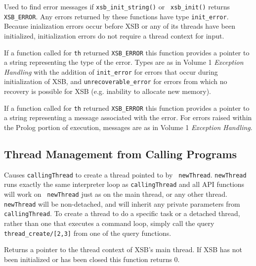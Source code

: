 \begin{description}
 
%
Used to find error messages if {\tt xsb\_init\_string()} or {\tt
  xsb\_init()} returns {\tt XSB\_ERROR}.  Any errors returned by these
functions have type {\tt init\_error}.  Because inialization errors
occur before XSB or any of its threads have been initialized,
initialization errors do not require a thread context for input.

 
%
If a function called for {\tt th} returned {\tt XSB\_ERROR} this
function provides a pointer to a string representing the type of the
error.  Types are as in Volume 1 {\em Exception Handling} with the
addition of {\tt init\_error} for errors that occur during
initialization of XSB, and {\tt unrecoverable\_error} for errors from
which no recovery is possible for XSB (e.g. inability to allocate new
memory).  

%
If a function called for {\tt th} returned {\tt XSB\_ERROR} this
function provides a pointer to a string representing a message
associated with the error.  For errors raised within the Prolog
portion of execution, messages are as in Volume 1 {\em Exception
  Handling}.

\end{description}

\subsection{Thread Management from Calling Programs}

\begin{description}

%
Causes {\tt callingThread} to create a thread pointed to by {\tt
  newThread}.  {\tt newThread} runs exactly the same interpreter loop
as {\tt callingThread} and all API functions will work on {\tt
  newThread} just as on the main thread, or any other thread.  {\tt
  newThread} will be non-detached, and will inherit any private
parameters from {\tt callingThread}.  To create a thread to do a
specific task or a detached thread, rather than one that executes a
command loop, simply call the query {\tt thread\_create/[2,3]} from
one of the query functions.

%
Returns a pointer to the thread context of XSB's main thread.  If XSB
has not been initialized or has been closed this function returns 0.



\end{description}

